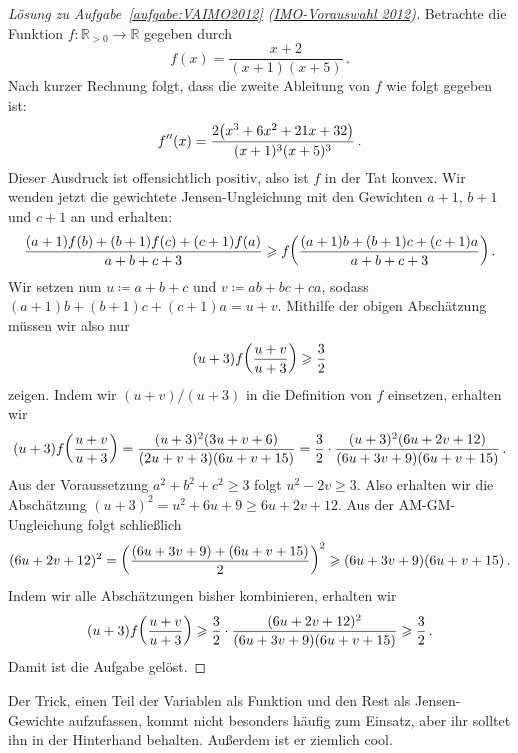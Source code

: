 \begin{proof}[Lösung zu Aufgabe~\ref{aufgabe:VAIMO2012} \textmd{(\href{https://www.mathe-wettbewerbe.de/fileadmin/Mathe-Wettbewerbe/AIMO/Aufgaben_und_Loesungen_AIMO/aufgaben_awb_12.pdf}{IMO-Vorauswahl 2012})}]
	Betrachte die Funktion $f\colon \mathbb R_{>0}\rightarrow \mathbb R$ gegeben durch
	\begin{equation*}
		f(x)=\frac{x+2}{(x+1)(x+5)}\,.
	\end{equation*}
	Nach kurzer Rechnung folgt, dass die zweite Ableitung von $f$ wie folgt gegeben ist:
	\begin{equation*}
		f''(x)=\frac{2\parens*{x^3+6x^2+21x+32}}{(x+1)^3(x+5)^3}\,.
	\end{equation*}
	Dieser Ausdruck ist offensichtlich positiv, also ist $f$ in der Tat konvex. Wir wenden jetzt die gewichtete Jensen-Ungleichung mit den Gewichten $a+1$, $b+1$ und $c+1$ an und erhalten:
	\begin{equation*}
		\frac{(a+1)f(b)+(b+1)f(c)+(c+1)f(a)}{a+b+c+3}\geqslant f\parens*{\frac{(a+1)b+(b+1)c+(c+1)a}{a+b+c+3}}\,.
	\end{equation*}
	Wir setzen nun $u\coloneqq a+b+c$ und $v\coloneqq ab+bc+ca$, sodass $(a+1)b+(b+1)c+(c+1)a=u+v$. Mithilfe der obigen Abschätzung müssen wir also nur
	\begin{equation*}
		(u+3)f\parens*{\frac{u+v}{u+3}}\geqslant\frac32
	\end{equation*}
	zeigen. Indem wir $(u+v)/(u+3)$ in die Definition von $f$ einsetzen, erhalten wir
	\begin{equation*}
		(u+3)f\parens*{\frac{u+v}{u+3}}=\frac{(u+3)^2(3u+v+6)}{(2u+v+3)(6u+v+15)}=\frac32\cdot \frac{(u+3)^2(6u+2v+12)}{(6u+3v+9)(6u+v+15)}\,.
	\end{equation*}
	Aus der Voraussetzung $a^2+b^2+c^2\geqslant 3$ folgt $u^2-2v\geqslant 3$. Also erhalten wir die Abschätzung $(u+3)^2=u^2+6u+9\geqslant 6u+2v+12$. Aus der AM-GM-Ungleichung folgt schließlich
	\begin{equation*}
		(6u+2v+12)^2=\parens*{\frac{(6u+3v+9)+(6u+v+15)}{2}}^2\geqslant (6u+3v+9)(6u+v+15)\,.
	\end{equation*}
	Indem wir alle Abschätzungen bisher kombinieren, erhalten wir
	\begin{equation*}
		(u+3)f\parens*{\frac{u+v}{u+3}}\geqslant \frac32\cdot \frac{(6u+2v+12)^2}{(6u+3v+9)(6u+v+15)}\geqslant \frac32\,.
	\end{equation*}
	Damit ist die Aufgabe gelöst.
\end{proof}
Der Trick, einen Teil der Variablen als Funktion und den Rest als Jensen-Gewichte aufzufassen, kommt nicht besonders häufig zum Einsatz, aber ihr solltet ihn in der Hinterhand behalten. Außerdem ist er ziemlich cool.